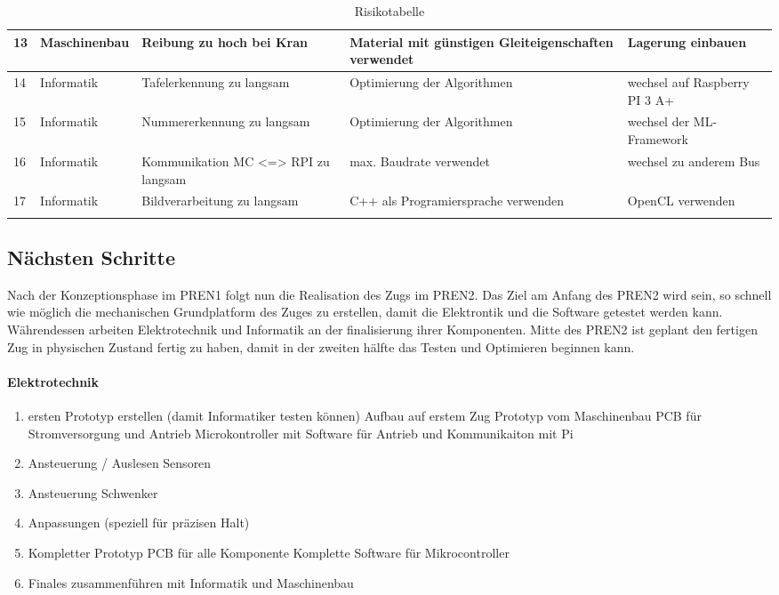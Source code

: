 \documentclass[../../main.tex]{subfiles}
\begin{document}
\begin{longtable}{|l|p{2.5cm}|p{3cm}|p{3.8cm}|p{3.8cm}|}
    13  & Maschinenbau & Reibung zu hoch bei Kran                                   & Material mit günstigen Gleiteigenschaften verwendet & Lagerung einbauen \\ \hline
    14 & Informatik    & Tafelerkennung zu langsam                              & Optimierung der Algorithmen   & wechsel auf Raspberry PI 3 A+ \\ \hline
    15 & Informatik     & Nummererkennung zu langsam                            & Optimierung der Algorithmen   & wechsel der ML- Framework \\ \hline
    16 & Informatik     & Kommunikation MC <=> RPI zu langsam                   & max. Baudrate verwendet       & wechsel zu anderem Bus \\ \hline
    17 & Informatik     & Bildverarbeitung zu langsam                           & C++ als Programiersprache verwenden & OpenCL verwenden \\ \hline
    \caption{Risikotabelle}
    \end{longtable}


\subsection{Nächsten Schritte}
Nach der Konzeptionsphase im PREN1 folgt nun die Realisation des Zugs im PREN2. Das Ziel am Anfang des PREN2 wird sein, so schnell wie möglich die mechanischen Grundplatform des Zuges zu erstellen, damit die Elektrontik und die Software getestet werden kann. Währendessen arbeiten Elektrotechnik und Informatik an der finalisierung ihrer Komponenten. Mitte des PREN2 ist geplant den fertigen Zug in physischen Zustand fertig zu haben, damit in der zweiten hälfte das Testen und Optimieren beginnen kann.
\paragraph{Elektrotechnik}
\begin{enumerate}
    \item ersten Prototyp erstellen (damit Informatiker testen können)
        \subitem Aufbau auf erstem Zug Prototyp vom Maschinenbau
        \subitem PCB für Stromversorgung und Antrieb
        \subitem Microkontroller mit Software für Antrieb und Kommunikaiton mit Pi
    \item Ansteuerung / Auslesen Sensoren
    \item Ansteuerung Schwenker
    \item Anpassungen (speziell für präzisen Halt)
    \item Kompletter Prototyp
        \subitem PCB für alle Komponente
        \subitem Komplette Software für Mikrocontroller
    \item Finales zusammenführen mit Informatik und Maschinenbau
\end{enumerate}
\end{document}
